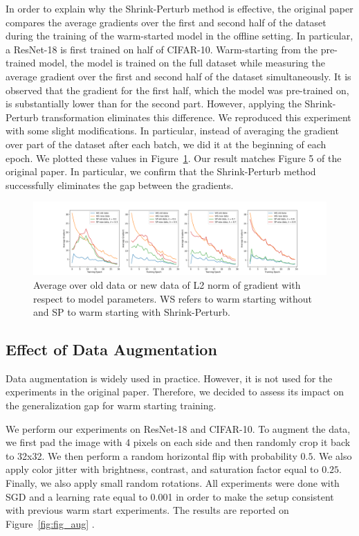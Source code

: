 In order to explain why the Shrink-Perturb method is effective, the original paper compares the average gradients over the first and second half of the dataset during the training of the warm-started model in the offline setting. In particular, a ResNet-18 is first trained on half of CIFAR-10. Warm-starting from the pre-trained model, the model is trained on the full dataset while measuring the average gradient over the first and second half of the dataset simultaneously.  It is observed that the gradient for the first half, which the model was pre-trained on, is substantially lower than for the second part. However, applying the Shrink-Perturb transformation eliminates this difference. We reproduced this experiment with some slight modifications. In particular, instead of averaging the gradient over part of the dataset after each batch, we did it at the beginning of each epoch. We plotted these values in Figure~\ref{fig:fig5-sp}. Our result matches Figure 5 of the original paper. In particular, we confirm that the Shrink-Perturb method successfully eliminates the gap between the gradients.

\begin{figure}
\begin{minipage}[t]{\linewidth}
    \includegraphics[width=\linewidth]{figures/fig5_shrink_pertrub.png}
    \caption{Average over old data or new data of L2 norm of gradient with respect to model parameters. WS refers to warm starting without and SP to warm starting with Shrink-Perturb.}
    \label{fig:fig5-sp}
\end{minipage}
\end{figure}


\subsection{Effect of Data Augmentation}
\label{sec:data-augmentation}

Data augmentation is widely used in practice. However, it is not used for the experiments in the original paper. Therefore, we decided to assess its impact on the generalization gap for warm starting training.

%
 We perform our experiments on ResNet-18 and CIFAR-10. To augment the data, we first pad the image with 4 pixels on each side and then randomly crop it back to 32x32. We then perform a random horizontal flip with probability $0.5$. We also apply color jitter with brightness, contrast, and saturation factor equal to $0.25$. Finally, we also apply small random rotations. All experiments were done with SGD and a learning rate equal to 0.001 in order to make the setup consistent with previous warm start experiments. The results are reported on Figure~\ref{fig:fig_aug} . 

